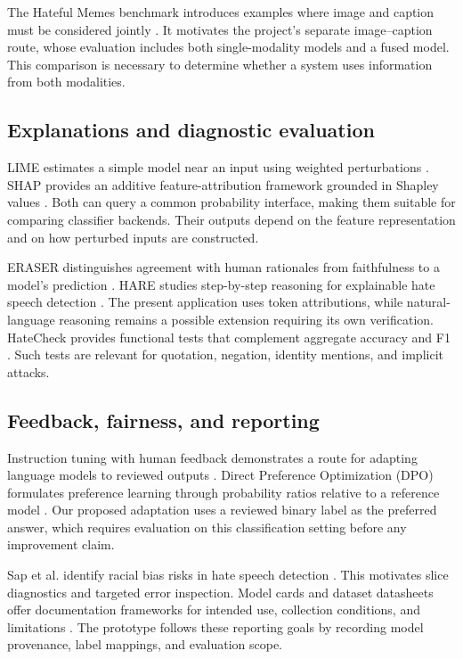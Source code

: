 \documentclass[11pt,a4paper]{article}
\begin{document}
The Hateful Memes benchmark introduces examples where image and caption
must be considered jointly \cite{memes}. It motivates the project's separate
image--caption route, whose evaluation includes both single-modality models
and a fused model. This comparison is necessary to determine whether a system
uses information from both modalities.

\subsection{Explanations and diagnostic evaluation}
LIME estimates a simple model near an input using weighted perturbations
\cite{lime}. SHAP provides an additive feature-attribution framework grounded
in Shapley values \cite{shap}. Both can query a common probability interface,
making them suitable for comparing classifier backends. Their outputs depend
on the feature representation and on how perturbed inputs are constructed.

ERASER distinguishes agreement with human rationales from faithfulness to a
model's prediction \cite{eraser}. HARE studies step-by-step reasoning for
explainable hate speech detection \cite{hare}. The present application uses
token attributions, while natural-language reasoning remains a possible
extension requiring its own verification. HateCheck provides functional tests
that complement aggregate accuracy and F1 \cite{hatecheck}. Such tests are
relevant for quotation, negation, identity mentions, and implicit attacks.

\subsection{Feedback, fairness, and reporting}
Instruction tuning with human feedback demonstrates a route for adapting
language models to reviewed outputs \cite{ouyang}. Direct Preference
Optimization (DPO) formulates preference learning through probability ratios
relative to a reference model \cite{dpo}. Our proposed adaptation uses a
reviewed binary label as the preferred answer, which requires evaluation on
this classification setting before any improvement claim.

Sap et al. identify racial bias risks in hate speech detection \cite{sap}.
This motivates slice diagnostics and targeted error inspection. Model cards
and dataset datasheets offer documentation frameworks for intended use,
collection conditions, and limitations \cite{modelcards,datasheets}.
The prototype follows these reporting goals by recording model provenance,
label mappings, and evaluation scope.
\end{document}
